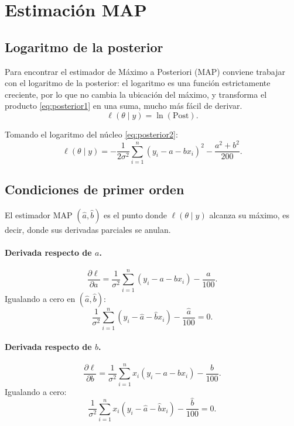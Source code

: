 \documentclass[11pt]{article}
\theoremstyle{remark}
\begin{document}
\section{Estimación MAP}
\label{sec:map}

\subsection{Logaritmo de la posterior}

Para encontrar el estimador de Máximo a Posteriori (MAP) conviene trabajar
con el logaritmo de la posterior: el logaritmo es una función estrictamente
creciente, por lo que no cambia la ubicación del máximo, y transforma el
producto \eqref{eq:posterior1} en una suma, mucho más fácil de derivar.
\begin{equation}
\ell(\theta\mid y) = \ln(\text{Post}).
\label{eq:loglik-def}
\end{equation}

Tomando el logaritmo del núcleo \eqref{eq:posterior2}:
\begin{equation}
\ell(\theta\mid y) = -\frac{1}{2\sigma^2}\sum_{i=1}^{n}(y_i-a-bx_i)^2
- \frac{a^2+b^2}{200}.
\label{eq:loglik}
\end{equation}

\subsection{Condiciones de primer orden}

El estimador MAP $(\hat a,\hat b)$ es el punto donde $\ell(\theta\mid y)$
alcanza su máximo, es decir, donde sus derivadas parciales se anulan.

\paragraph{Derivada respecto de $a$.}
\begin{equation}
\frac{\partial \ell}{\partial a}
= \frac{1}{\sigma^2}\sum_{i=1}^n (y_i-a-bx_i) - \frac{a}{100}.
\label{eq:dl-da}
\end{equation}
Igualando a cero en $(\hat a,\hat b)$:
\begin{equation}
\frac{1}{\sigma^2}\sum_{i=1}^n (y_i-\hat a-\hat b x_i) - \frac{\hat a}{100} = 0.
\label{eq:foc-a}
\end{equation}

\paragraph{Derivada respecto de $b$.}
\begin{equation}
\frac{\partial \ell}{\partial b}
= \frac{1}{\sigma^2}\sum_{i=1}^n x_i(y_i-a-bx_i) - \frac{b}{100}.
\label{eq:dl-db}
\end{equation}
Igualando a cero:
\begin{equation}
\frac{1}{\sigma^2}\sum_{i=1}^n x_i(y_i-\hat a-\hat b x_i) - \frac{\hat b}{100} = 0.
\label{eq:foc-b}
\end{equation}
\end{document}
